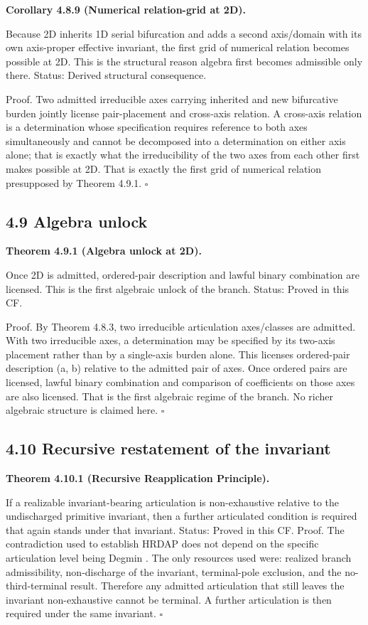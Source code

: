 \documentclass[11pt]{article}
\begin{document}
\textbf{Corollary 4.8.9 (Numerical relation-grid at 2D).}

Because 2D inherits 1D serial bifurcation and adds a second axis/domain with its own axis-proper effective invariant, the first grid of numerical relation becomes possible at 2D. This is the structural reason algebra first becomes admissible only there. Status: Derived structural consequence.

Proof. Two admitted irreducible axes carrying inherited and new bifurcative burden jointly license pair-placement and cross-axis relation. A cross-axis relation is a determination whose specification requires reference to both axes simultaneously and cannot be decomposed into a determination on either axis alone; that is exactly what the irreducibility of the two axes from each other first makes possible at 2D. That is exactly the first grid of numerical relation presupposed by Theorem 4.9.1. $\square$

\subsection{4.9 Algebra unlock}\label{algebra-unlock}

\textbf{Theorem 4.9.1 (Algebra unlock at 2D).}

Once 2D is admitted, ordered-pair description and lawful binary combination are licensed. This is the first algebraic unlock of the branch. Status: Proved in this CF.

Proof. By Theorem 4.8.3, two irreducible articulation axes/classes are admitted. With two irreducible axes, a determination may be specified by its two-axis placement rather than by a single-axis burden alone. This licenses ordered-pair description (a, b) relative to the admitted pair of axes. Once ordered pairs are licensed, lawful binary combination and comparison of coefficients on those axes are also licensed. That is the first algebraic regime of the branch. No richer algebraic structure is claimed here. $\square$

\subsection{4.10 Recursive restatement of the invariant}\label{recursive-restatement-of-the-invariant}

\textbf{Theorem 4.10.1 (Recursive Reapplication Principle).}

If a realizable invariant-bearing articulation is non-exhaustive relative to the undischarged primitive invariant, then a further articulated condition is required that again stands under that invariant. Status: Proved in this CF. Proof. The contradiction used to establish HRDAP does not depend on the specific articulation level being Degmin . The only resources used were: realized branch admissibility, non-discharge of the invariant, terminal-pole exclusion, and the no-third-terminal result. Therefore any admitted articulation that still leaves the invariant non-exhaustive cannot be terminal. A further articulation is then required under the same invariant. $\square$
\end{document}
